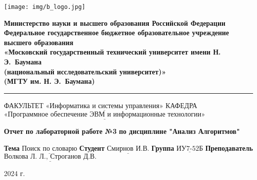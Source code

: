 \begin{titlepage}
	\fontsize{12pt}{12pt}\selectfont
	\noindent \begin{minipage}{0.15\textwidth}
		\texttt{[image: img/b\_logo.jpg]}
	\end{minipage}
	\noindent\begin{minipage}{0.9\textwidth}\centering
		\textbf{Министерство науки и высшего образования Российской Федерации}\\
		\textbf{Федеральное государственное бюджетное образовательное учреждение высшего образования}\\
		\textbf{«Московский государственный технический университет имени Н. Э.~Баумана}\\
		\textbf{(национальный исследовательский университет)»}\\
		\textbf{(МГТУ им. Н. Э.~Баумана)}
	\end{minipage}
	
	\noindent\rule{18cm}{3pt}
	\newline\newline
	\noindent ФАКУЛЬТЕТ $\underline{\text{«Информатика и системы управления»}}$ \newline
	\noindent КАФЕДРА $\underline{\text{«Программное обеспечение ЭВМ и информационные технологии»}}$\newline\newline\newline\newline\newline\newline\newline\newline
	
	
	\begin{center}
		\noindent\begin{minipage}{1.3\textwidth}\centering
		\Large\textbf{   Отчет по лабораторной работе №3}\newline
		\textbf{по дисциплине "Анализ Алгоритмов"}\newline\newline\newline
		\end{minipage}
	\end{center}
	
	\noindent\textbf{Тема} 			$\underline{\text{Поиск по словарю}}$\newline\newline
	\noindent\textbf{Студент} 		$\underline{\text{Смирнов И.В.}}$\newline\newline
	\noindent\textbf{Группа} 		$\underline{\text{ИУ7-52Б}}$\newline\newline
	\noindent\textbf{Преподаватель} $\underline{\text{Волкова Л. Л., Строганов Д.В.}}$\newline
	
	\begin{center}
        \vfill
		2024 г.
	\end{center}
	\restoregeometry
\end{titlepage}